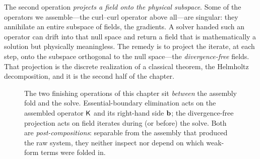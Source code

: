 The second operation \emph{projects a field onto the physical subspace}. Some of
the operators we assemble---the curl--curl operator above all---are singular:
they annihilate an entire subspace of fields, the gradients. A solver handed such
an operator can drift into that null space and return a field that is
mathematically a solution but physically meaningless. The remedy is to project
the iterate, at each step, onto the subspace orthogonal to the null space---the
\emph{divergence-free} fields. That projection is the discrete realization of a
classical theorem, the Helmholtz decomposition, and it is the second half of the
chapter.

\begin{figure}[t]
\centering
{}
\caption[Where the finishing operations sit]{The two finishing operations of this
chapter sit \emph{between} the assembly fold and the solve. Essential-boundary
elimination acts on the assembled operator $\mathsf{K}$ and its right-hand side
$\mathbf{b}$; the divergence-free projection acts on field iterates during (or before)
the solve. Both are \emph{post-compositions}: separable from the assembly that
produced the raw system, they neither inspect nor depend on which weak-form terms
were folded in.}
\label{fig:finishing}
\end{figure}


